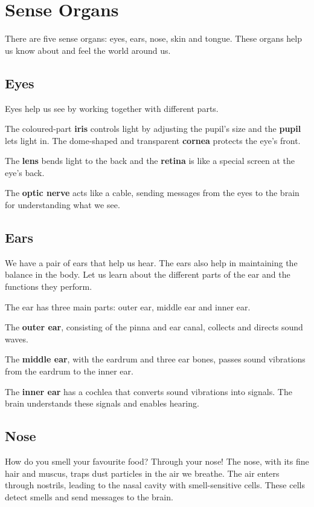\section{Sense Organs}
There are five sense organs: eyes, ears, nose, skin and tongue. These organs help us know about and feel the world around us.
\subsection{Eyes}
Eyes help us see by working together with different parts.
\vspace{0.1in}
\par
The coloured-part \textbf{iris} controls light by adjusting the pupil's size and the \textbf{pupil} lets light in. The dome-shaped and transparent \textbf{cornea} protects the eye's front.
\vspace{0.1in}
\par
The \textbf{lens} bends light to the back and the \textbf{retina} is like a special screen at the eye's back.
\vspace{0.1in}
\par
The \textbf{optic nerve} acts like a cable, sending messages from the eyes to the brain for understanding what we see.
\subsection{Ears}
We have a pair of ears that help us hear. The ears also help in maintaining the balance in the body. Let us learn about the different parts of the ear and the functions they perform.
\vspace{0.1in}
\par
The ear has three main parts: outer ear, middle ear and inner ear.
\vspace{0.1in}
\par
The \textbf{outer ear}, consisting of the pinna and ear canal, collects and directs sound waves.
\vspace{0.1in}
\par
The \textbf{middle ear}, with the eardrum and three ear bones, passes sound vibrations from the eardrum to the inner ear.
\vspace{0.1in}
\par
The \textbf{inner ear} has a cochlea that converts sound vibrations into signals. The brain understands these signals and enables hearing.
\vspace{2.8in}
\subsection{Nose}
How do you smell your favourite food? Through your nose! The nose, with its fine hair and muscus, traps dust particles in the air we breathe. The air enters through nostrils, leading to the nasal cavity with smell-sensitive cells. These cells detect smells and send messages to the brain.
